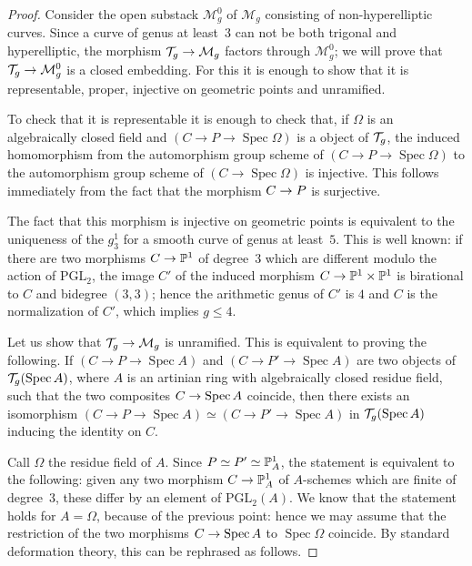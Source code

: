 \documentclass{amsart}
\numberwithin{equation}{section}
\numberwithin{subsection}{section}
\theoremstyle{definition}
\theoremstyle{remark}
\newcommand\cM{\mathcal{M}} \newcommand\cN{\mathcal{N}}
\newcommand\arr{\ifinner\to\else\longrightarrow\fi}
\newcommand\spec{\operatorname{Spec}}
\newcommand{\T}[1][g]{\cT_{#1}}
\newcommand{\PGL}{\mathrm{PGL}}
\begin{document}
\begin{proof}


Consider the open substack $\cM^{0}_{g}$ of $\cM_{g}$ consisting of non-hyperelliptic curves. Since a curve of genus at least~$3$ can not be both trigonal and hyperelliptic, the morphism $\T \arr \cM_{g}$ factors through $\cM^{0}_{g}$; we will prove that $\T \arr \cM^{0}_{g}$ is a closed embedding. For this it is enough to show that it is representable, proper, injective on geometric points and unramified.


To check that it is representable it is enough to check that, if $\Omega$ is an algebraically closed field and $(C \to P \to \spec\Omega)$ is a object of $\T$, the induced homomorphism from the automorphism group scheme of $(C \to P \to \spec\Omega)$ to the automorphism group scheme of $(C \to \spec\Omega)$ is injective. This follows immediately from the fact that the morphism $C \arr P$ is surjective.

The fact that this morphism is injective on geometric points is equivalent to the uniqueness of the $g^{1}_{3}$ for a smooth curve of genus at least~$5$. This is well known: if there are two morphisms $C \arr \PP^{1}$ of degree~$3$ which are different modulo the action of $\PGL_{2}$, the image $C'$ of the induced morphism $C \arr \PP^{1} \times \PP^{1}$ is birational to $C$ and bidegree $(3,3)$; hence the arithmetic genus of $C'$ is $4$ and $C$ is the normalization of $C'$, which implies $g \leq 4$.

Let us show that $\cT_g \arr \cM_{g}$ is unramified. This is equivalent to proving the following. If $(C \to P \to \spec A)$ and $(C \to P' \to \spec A)$ are two objects of $\cT_g(\spec A)$, where $A$ is an artinian ring with algebraically closed residue field, such that the two composites $C \arr \spec A$ coincide, then there exists an isomorphism $(C \to P \to \spec A) \simeq (C \to P' \to \spec A)$ in $\cT_g(\spec A)$ inducing the identity on $C$.

Call $\Omega$ the residue field of $A$. Since $P \simeq P' \simeq \mathbb{P}^{1}_{A}$, the statement is equivalent to the following: given any two morphism $C \arr \PP^{1}_{A}$ of $A$-schemes which are finite of degree~$3$, these differ by an element of $\PGL_{2}(A)$. We know that the statement holds for $A = \Omega$, because of the previous point: hence we may assume that the restriction of the two morphisms $C \arr \spec A$ to $\spec \Omega$ coincide. By standard deformation theory, this can be rephrased as follows.


\end{proof}
\end{document}
